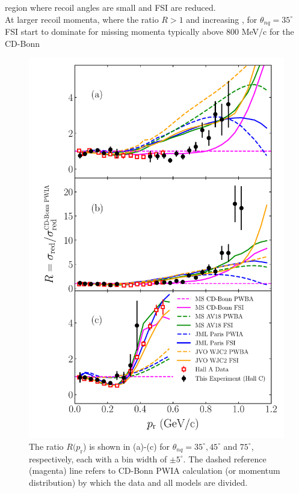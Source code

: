 region where recoil angles are small and FSI are reduced. \\
\indent At larger recoil momenta, where the ratio \DIFdelbegin {}\DIFdelend $R>1$ and increasing \DIFaddbegin {}\DIFaddend , for $\theta_{nq}=35^{\circ}$ FSI start to dominate for
missing momenta typically above 800 MeV/c for the \DIFaddbegin {}\DIFaddend CD-Bonn
\DIFdelbegin %
\DIFdelendFL \DIFaddbeginFL \begin{figure}[!t]
\DIFaddendFL \includegraphics[scale=0.5]{./prl_plots/PRL_plot2.pdf}
\caption{The ratio $R(p_{\mathrm{r}}$) is shown in (a)-(c) for $\theta_{nq}=35^{\circ}, 45^{\circ}$ and $75^{\circ}$, respectively, each with a bin width of $\pm 5^{\circ}$.
The dashed reference (magenta) line refers to \DIFaddbeginFL {}\DIFaddendFL CD-Bonn PWIA calculation (or momentum distribution) by which the data and all models are divided.}
\label{fig:fig2}
\end{figure}
